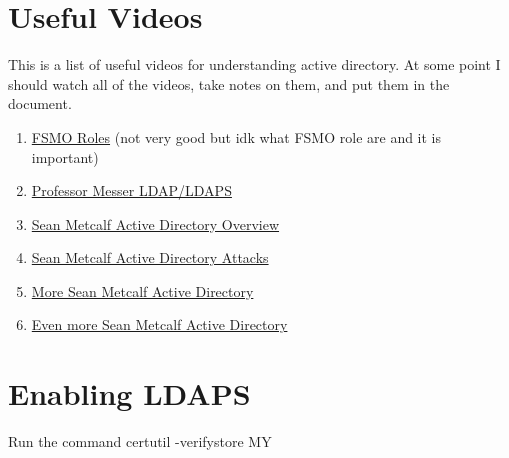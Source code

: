 \documentclass{article}
\begin{document}
\section{Useful Videos}
This is a list of useful videos for understanding active directory.
At some point I should watch all of the videos, take notes on them, and put them in the document.
\begin{enumerate}
        \item \href{https://youtu.be/n5suPvKqo_Y}{FSMO Roles} (not very good but idk what FSMO role are and it is important)
        \item \href{https://youtu.be/5rEA7vRV3VE}{Professor Messer LDAP/LDAPS}
        \item \href{https://youtu.be/2w1cesS7pGY}{Sean Metcalf Active Directory Overview}
        \item \href{https://youtu.be/ze1UcSLOypw}{Sean Metcalf Active Directory Attacks}
        \item \href{https://youtu.be/Lz6haohGAMc}{More Sean Metcalf Active Directory}
        \item\href{https://youtu.be/b6GUXerE9Ac}{Even more Sean Metcalf Active Directory}
\end{enumerate}

\section{Enabling LDAPS}
Run the command certutil -verifystore MY
\end{document}
